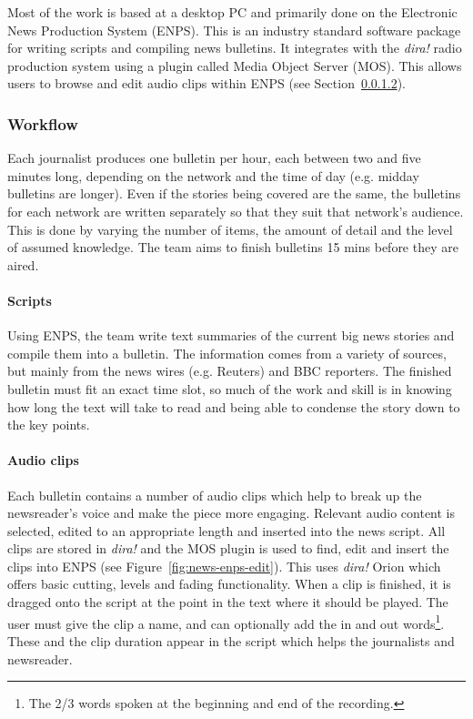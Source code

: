 Most of the work is based at a desktop PC and primarily done on the Electronic News Production System (ENPS). This is
an industry standard software package for writing scripts and compiling news bulletins. It integrates with the
\textit{dira!} radio production system using a plugin called Media Object Server (MOS). This allows users to browse and
edit audio clips within ENPS (see Section~\ref{sec:news-clips}).

\subsubsection{Workflow}
Each journalist produces one bulletin per hour, each between two and five minutes long, depending on the network and
the time of day (e.g. midday bulletins are longer). Even if the stories being covered are the same, the bulletins for
each network are written separately so that they suit that network's audience. This is done by varying the number of
items, the amount of detail and the level of assumed knowledge. The team aims to finish bulletins 15 mins before they
are aired.

\paragraph{Scripts}
Using ENPS, the team write text summaries of the current big news stories and compile them into a bulletin. The
information comes from a variety of sources, but mainly from the news wires (e.g. Reuters) and BBC reporters.  The
finished bulletin must fit an exact time slot, so much of the work and skill is in knowing how long the text will take
to read and being able to condense the story down to the key points. 

\paragraph{Audio clips}\label{sec:news-clips}
Each bulletin contains a number of audio clips which help to break up the newsreader's voice and make the piece more
engaging.  Relevant audio content is selected, edited to an appropriate length and inserted into the news script.  All
clips are stored in \textit{dira!} and the MOS plugin is used to find, edit and insert the clips into ENPS (see
Figure~\ref{fig:news-enps-edit}).  This uses \textit{dira!} Orion which offers basic cutting, levels and fading
functionality. When a clip is finished, it is dragged onto the script at the point in the text where it should be
played. The user must give the clip a name, and can optionally add the in and out words\footnote{The 2/3 words spoken
  at the beginning and end of the recording.}. These and the clip duration appear in the script which helps the
journalists and newsreader.

